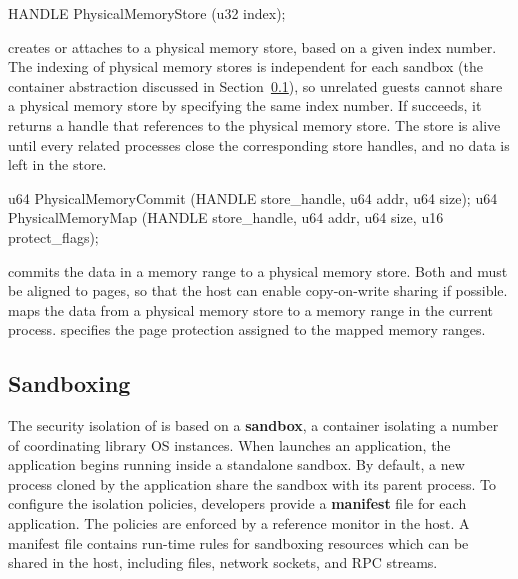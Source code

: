 \begin{paldef}
HANDLE PhysicalMemoryStore  (u32 index);
\end{paldef}


 creates or attaches to a physical memory store,
based on a given index number.
The indexing of physical memory stores is independent for each sandbox (the container abstraction discussed in Section~\ref{sec:abi:proc:sandbox}),
so unrelated guests cannot share a physical memory store by specifying the same index number.
If  succeeds,
it returns a handle that references to the physical memory store.
The store is alive until every related processes close the corresponding store handles,
and no data is left in the store.




\begin{paldef}
u64 PhysicalMemoryCommit (HANDLE store_handle, u64 addr, u64 size);
u64 PhysicalMemoryMap    (HANDLE store_handle, u64 addr, u64 size,
                          u16 protect_flags);
\end{paldef}


 commits the data in a memory range to a physical memory store.
Both  and  must be aligned to pages,
so that the host can enable copy-on-write sharing if possible.
 maps the data from a physical memory store
to a memory range in the current process.
 specifies the page protection assigned to the mapped memory ranges.




\subsection{Sandboxing}
\label{sec:abi:proc:sandbox}


The security isolation of \graphene{} is based on a {\bf sandbox}, a container isolating a number of coordinating library OS instances.
When \graphene{} launches an application, the application begins running inside a standalone sandbox.
By default, a new process cloned by the application share the sandbox
with its parent process.
To configure the isolation policies,
developers provide a {\bf manifest} file for each application.
The policies are enforced by a reference monitor in the host.
A manifest file contains run-time rules for sandboxing resources which can be shared in the host,
including files, network sockets, and RPC streams.



